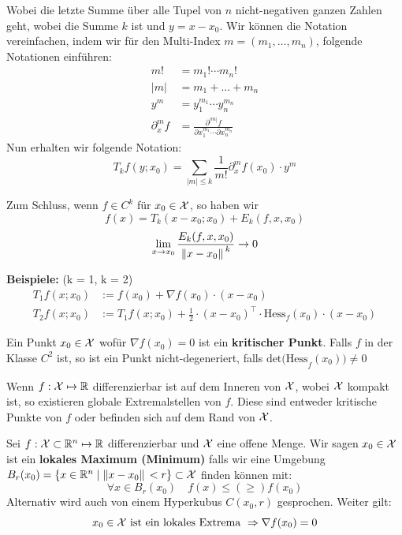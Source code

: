 Wobei die letzte Summe über alle Tupel von $n$ nicht-negativen ganzen Zahlen geht, wobei die Summe $k$ ist und $y = x - x_0$. Wir können die Notation 
vereinfachen, indem wir für den Multi-Index $m = (m_1, \dots , m_n)$, folgende Notationen einführen:
\begin{align*}
    m!  &= m_1! \cdots m_n! \\
    |m| &= m_1 + ... + m_n \\
    y^m &= y_1^{m_1} \cdots y_n^{m_n} \\
    \partial_x^m f &= \frac{\partial^{|m|} f}{\partial x_1^{m_1} \cdots \partial x_n^{m_n}}
\end{align*}
Nun erhalten wir folgende Notation:
$$T_k f(y; x_0) = \sum_{|m| \leq k} \frac{1}{m!}\partial_x^m f(x_0) \cdot y^m $$

Zum Schluss, wenn $f \in C^k$ für $x_0 \in \mathcal{X}$, so haben wir
$$f(x) = T_k(x - x_0; x_0) + E_k(f, x, x_0)$$
$$\lim_{x \to x_0} \frac{E_k(f, x, x_0)}{\norm*{x - x_0}^k} \to 0$$
\medskip

\textbf{Beispiele:} (k = 1, k = 2)
\begin{align*}
  T_1 f(x; x_0) &:= f(x_0) + \nabla f(x_0) \cdot (x - x_0) \\
  T_2 f(x; x_0) &:= T_1 f(x; x_0) + \frac{1}{2} \cdot (x - x_0)^\top \cdot \text{Hess}_f(x_0) \cdot (x - x_0)
\end{align*}



Ein Punkt $x_0 \in \mathcal{X}$ wofür $\nabla f(x_0) = 0$ ist ein \textbf{kritischer Punkt}. Falls $f$ in der Klasse 
$C^2$ ist, so ist ein Punkt nicht-degeneriert, falls $\text{det(Hess}_f(x_0)) \neq 0$


\vfill\null
\columnbreak



Wenn $f: \mathcal{X} \mapsto \mathbb{R}$ differenzierbar ist auf dem Inneren von $\mathcal{X}$, wobei $\mathcal{X}$ kompakt ist, so existieren
globale Extremalstellen von $f$. Diese sind entweder kritische Punkte von $f$ oder befinden sich auf dem Rand
von $\mathcal{X}$.


Sei $f: \mathcal{X} \subset \mathbb{R}^n \mapsto \mathbb{R}$ differenzierbar und $ \mathcal{X}$ eine offene Menge. Wir sagen $x_0 \in \mathcal{X}$ ist ein
\textbf{lokales Maximum (Minimum)} falls wir eine Umgebung 
$B_r(x_0) = \{ x \in \mathbb{R}^n\;|\; \norm*{x - x_0} < r \} \subset \mathcal{X}$
finden können mit:
$$\forall x \in B_r(x_0) \quad f(x) \leq (\geq) f(x_0)$$
Alternativ wird auch von einem Hyperkubus $C(x_0, r)$ gesprochen. Weiter gilt:
$$x_0 \in \mathcal{X} \text{ ist ein lokales Extrema } \Rightarrow \nabla f(x_0) = 0$$

